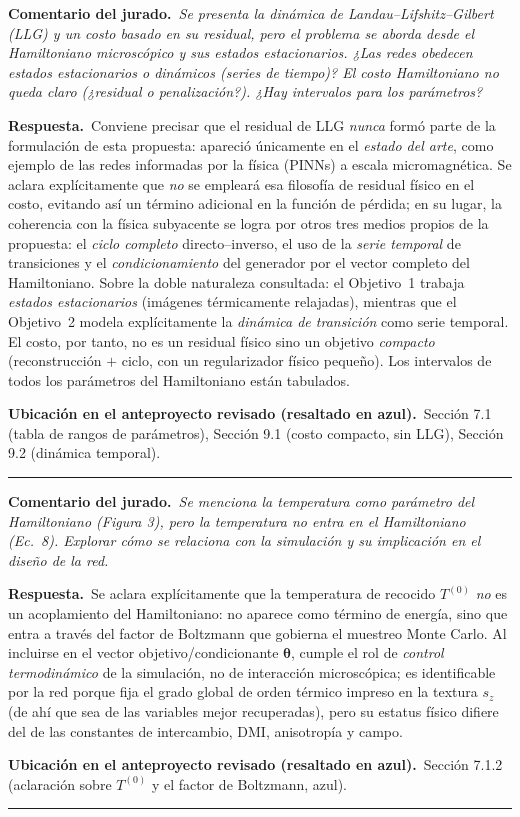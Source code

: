 \documentclass[11pt]{article}
\newcommand{\comentario}[1]{\par\smallskip\noindent\textbf{\color{jgris}Comentario del jurado.}\ \textit{#1}\par}
\newcommand{\respuesta}[1]{\par\smallskip\noindent\textbf{\color{jverde}Respuesta.}\ #1\par}
\newcommand{\ubic}[1]{\par\smallskip\noindent\textbf{\color{jazul}Ubicación en el anteproyecto revisado (resaltado en azul).}\ #1\par\medskip\hrule\medskip}
\begin{document}
\comentario{Se presenta la dinámica de Landau--Lifshitz--Gilbert (LLG) y un costo basado en su residual, pero el problema se aborda desde el Hamiltoniano microscópico y sus estados estacionarios. ¿Las redes obedecen estados estacionarios o dinámicos (series de tiempo)? El costo Hamiltoniano no queda claro (¿residual o penalización?). ¿Hay intervalos para los parámetros?}
\respuesta{Conviene precisar que el residual de LLG \emph{nunca} formó parte de la formulación de esta propuesta: apareció únicamente en el \emph{estado del arte}, como ejemplo de las redes informadas por la física (PINNs) a escala micromagnética. Se aclara explícitamente que \emph{no} se empleará esa filosofía de residual físico en el costo, evitando así un término adicional en la función de pérdida; en su lugar, la coherencia con la física subyacente se logra por otros tres medios propios de la propuesta: el \emph{ciclo completo} directo--inverso, el uso de la \emph{serie temporal} de transiciones y el \emph{condicionamiento} del generador por el vector completo del Hamiltoniano. Sobre la doble naturaleza consultada: el Objetivo~1 trabaja \emph{estados estacionarios} (imágenes térmicamente relajadas), mientras que el Objetivo~2 modela explícitamente la \emph{dinámica de transición} como serie temporal. El costo, por tanto, no es un residual físico sino un objetivo \emph{compacto} (reconstrucción $+$ ciclo, con un regularizador físico pequeño). Los intervalos de todos los parámetros del Hamiltoniano están tabulados.}
\ubic{Sección 7.1 (tabla de rangos de parámetros), Sección 9.1 (costo compacto, sin LLG), Sección 9.2 (dinámica temporal).}

\comentario{Se menciona la temperatura como parámetro del Hamiltoniano (Figura 3), pero la temperatura no entra en el Hamiltoniano (Ec.\ 8). Explorar cómo se relaciona con la simulación y su implicación en el diseño de la red.}
\respuesta{Se aclara explícitamente que la temperatura de recocido $T^{(0)}$ \emph{no} es un acoplamiento del Hamiltoniano: no aparece como término de energía, sino que entra a través del factor de Boltzmann que gobierna el muestreo Monte Carlo. Al incluirse en el vector objetivo/condicionante $\boldsymbol{\theta}$, cumple el rol de \emph{control termodinámico} de la simulación, no de interacción microscópica; es identificable por la red porque fija el grado global de orden térmico impreso en la textura $s_z$ (de ahí que sea de las variables mejor recuperadas), pero su estatus físico difiere del de las constantes de intercambio, DMI, anisotropía y campo.}
\ubic{Sección 7.1.2 (aclaración sobre $T^{(0)}$ y el factor de Boltzmann, azul).}
\end{document}
